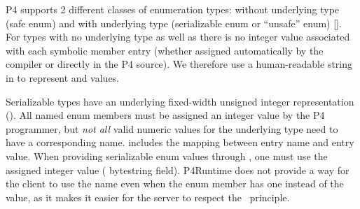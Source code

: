\documentclass[11pt]{article}
\begin{document}
{%
\noindent{}P4 supports 2 different classes of enumeration types: without underlying
type (safe enum) and with underlying type (serializable enum or \textquotedblleft{}unsafe\textquotedblright{} enum)
[]. For  types with no underlying type \textemdash{} as well as  \textemdash{}
there is no integer value associated with each symbolic member entry (whether
assigned automatically by the compiler or directly in the P4 source). We
therefore use a human-readable string in  to represent  and
 values.%

Serializable  types have an underlying fixed-width unsigned integer
representation (). All named enum members must be assigned an integer
value by the P4 programmer, but \emph{not all} valid numeric values for the
underlying type need to have a corresponding name.  includes the
mapping between entry name and entry value. When providing serializable enum
values through , one must use the assigned integer value (
bytestring field). P4Runtime does not provide a way for the client to use the
name \textemdash{} even when the enum member has one \textemdash{} instead of the value, as it makes it
easier for the server to respect the~ principle.%

}
\end{document}
